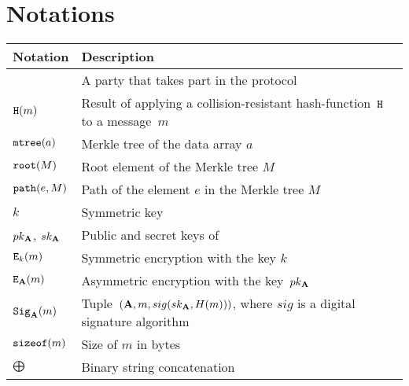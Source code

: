 \appendix
\section{Notations}

\tabulinesep=3pt
\begin{longtabu} to \textwidth {| X[1,r] | X[5,l] |}
  \hline
  \textbf{Notation} &  \textbf{Description}\\ \hline
  \endhead
   & A party that takes part in the protocol \\ \hline
  $\mathtt{H}(m)$ & Result of applying a collision-resistant hash-function~$\mathtt{H}$ to a message~$m$ \\ \hline
  $\mathtt{mtree}(a)$ & Merkle tree of the data array $a$ \\ \hline
  $\mathtt{root}(M)$ & Root element of the Merkle tree $M$ \\ \hline
  $\mathtt{path}(e, M)$ & Path of the element $e$ in the Merkle tree $M$ \\ \hline
  $k$ & Symmetric key \\ \hline
  $pk_{\mathbf{A}}$, $sk_{\mathbf{A}}$ & Public and secret keys of  \\ \hline
  $\mathtt{E}_k(m)$ & Symmetric encryption with the key $k$ \\ \hline
  $\mathtt{E}_{\mathbf{A}}(m)$ & Asymmetric encryption with the key~$pk_{\mathbf{A}}$\footnotemark\\ \hline
  $\mathtt{Sig}_{\mathbf{A}}(m)$ & Tuple~$(\mathbf{A}, m, sig(sk_{\mathbf{A}}, H(m)))$, where $sig$ is a digital signature algorithm \\ \hline
  $\mathtt{sizeof}(m)$ & Size of $m$ in bytes \\ \hline
  $\bigoplus$ & Binary string concatenation \\ \hline
\end{longtabu}
